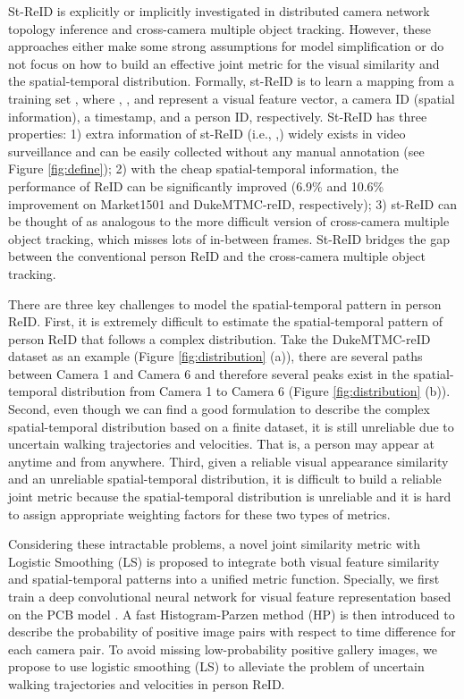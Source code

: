 \documentclass[letterpaper]{article} \usepackage{aaai19}  \usepackage{times}  \usepackage{helvet}  \usepackage{courier}  \usepackage{url}  \usepackage{graphicx}  \usepackage{subfig}
\begin{document}
St-ReID is explicitly or implicitly investigated in distributed camera network topology inference \cite{huang2016mmm,yeong} and cross-camera multiple object tracking. However, these approaches either make some strong assumptions for model simplification or do not focus on how to build an effective joint metric for the visual similarity and the spatial-temporal distribution. Formally, st-ReID is to learn a mapping  from a training set , where , ,  and  represent a visual feature vector, a camera ID (spatial information), a timestamp, and a person ID, respectively. St-ReID has three properties: 1) extra information of st-ReID (i.e., ,) widely exists in video surveillance and can be easily collected without any manual annotation (see Figure \ref{fig:define}); 2) with the cheap spatial-temporal information, the performance of ReID can be significantly improved (6.9\% and 10.6\% improvement on Market1501 and DukeMTMC-reID, respectively); 3) st-ReID can be thought of as analogous to the more difficult version of cross-camera multiple object tracking, which misses lots of in-between frames. St-ReID bridges the gap between the conventional person ReID and the cross-camera multiple object tracking.

There are three key challenges to model the spatial-temporal pattern in person ReID. First, it is extremely difficult to estimate the spatial-temporal pattern of person ReID that follows a complex distribution. Take the  DukeMTMC-reID dataset as an example (Figure \ref{fig:distribution} (a)), there are several paths between Camera 1 and Camera 6 and therefore several peaks exist in the spatial-temporal distribution from Camera 1 to Camera 6 (Figure \ref{fig:distribution} (b)). Second, even though we can find a good formulation to describe the complex spatial-temporal distribution based on a finite dataset, it is still unreliable due to uncertain walking trajectories and velocities. That is, a person may appear at anytime and from anywhere. Third, given a reliable visual appearance similarity and an unreliable spatial-temporal distribution, it is difficult to build a reliable joint metric because the spatial-temporal distribution is unreliable and it is hard to assign appropriate weighting factors for these two types of metrics.


Considering these intractable problems, a novel joint similarity metric with Logistic Smoothing (LS) is proposed to integrate both visual feature similarity and spatial-temporal patterns into a unified metric function. Specially, we first train a deep convolutional neural network for visual feature representation based on the PCB model \cite{Yifan2017arxiv}. A fast Histogram-Parzen method (HP) is then introduced to describe the probability of positive image pairs with respect to time difference for each camera pair. To avoid missing low-probability positive gallery images, we propose to use logistic smoothing (LS) to alleviate the problem of uncertain walking trajectories and velocities in person ReID.
\end{document}
